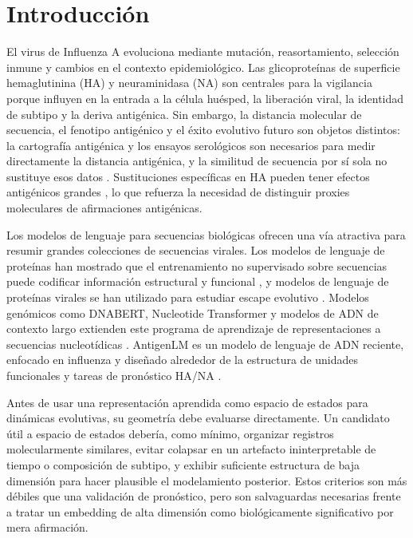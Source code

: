 \documentclass[11pt]{article}
\begin{document}
\section{Introducción}

El virus de Influenza A evoluciona mediante mutación, reasortamiento, selección inmune y cambios en el contexto epidemiológico. Las glicoproteínas de superficie hemaglutinina (HA) y neuraminidasa (NA) son centrales para la vigilancia porque influyen en la entrada a la célula huésped, la liberación viral, la identidad de subtipo y la deriva antigénica. Sin embargo, la distancia molecular de secuencia, el fenotipo antigénico y el éxito evolutivo futuro son objetos distintos: la cartografía antigénica y los ensayos serológicos son necesarios para medir directamente la distancia antigénica, y la similitud de secuencia por sí sola no sustituye esos datos \cite{smith2004mapping,bedford2014integrating}. Sustituciones específicas en HA pueden tener efectos antigénicos grandes \cite{koel2013substitutions}, lo que refuerza la necesidad de distinguir proxies moleculares de afirmaciones antigénicas.

Los modelos de lenguaje para secuencias biológicas ofrecen una vía atractiva para resumir grandes colecciones de secuencias virales. Los modelos de lenguaje de proteínas han mostrado que el entrenamiento no supervisado sobre secuencias puede codificar información estructural y funcional \cite{rives2021biological}, y modelos de lenguaje de proteínas virales se han utilizado para estudiar escape evolutivo \cite{hie2021viral}. Modelos genómicos como DNABERT, Nucleotide Transformer y modelos de ADN de contexto largo extienden este programa de aprendizaje de representaciones a secuencias nucleotídicas \cite{ji2021dnabert,dallatorre2025nucleotide,nguyen2023hyenadna}. AntigenLM es un modelo de lenguaje de ADN reciente, enfocado en influenza y diseñado alrededor de la estructura de unidades funcionales y tareas de pronóstico HA/NA \cite{pei2026antigenlm}.

Antes de usar una representación aprendida como espacio de estados para dinámicas evolutivas, su geometría debe evaluarse directamente. Un candidato útil a espacio de estados debería, como mínimo, organizar registros molecularmente similares, evitar colapsar en un artefacto ininterpretable de tiempo o composición de subtipo, y exhibir suficiente estructura de baja dimensión para hacer plausible el modelamiento posterior. Estos criterios son más débiles que una validación de pronóstico, pero son salvaguardas necesarias frente a tratar un embedding de alta dimensión como biológicamente significativo por mera afirmación.
\end{document}
